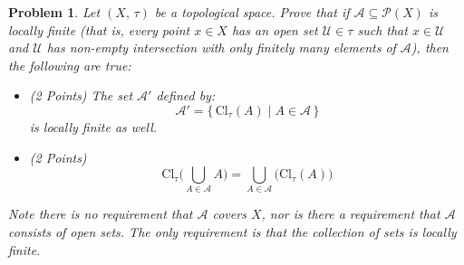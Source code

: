 \documentclass{article}
\theoremstyle{normal}
\newtheorem{problem}{Problem}
\begin{document}
    \begin{problem}
        Let $(X,\,\tau)$ be a topological space. Prove that if
        $\mathcal{A}\subseteq\mathcal{P}(X)$ is locally finite (that is,
        every point $x\in{X}$ has an open set $\mathcal{U}\in\tau$ such that
        $x\in\mathcal{U}$ and $\mathcal{U}$ has non-empty intersection with
        only finitely many elements of $\mathcal{A}$), then the following are
        true:
        \begin{itemize}
            \item (2 Points) The set $\mathcal{A}'$ defined by:
                \begin{equation}
                    \mathcal{A}'=
                    \{\,\textrm{Cl}_{\tau}(A)\;|\;A\in\mathcal{A}\,\}
                \end{equation}
                is locally finite as well.
            \item (2 Points)
                \begin{equation}
                    \textrm{Cl}_{\tau}\Big(\bigcup_{A\in\mathcal{A}}A\Big)
                    =\bigcup_{A\in\mathcal{A}}\big(\textrm{Cl}_{\tau}(A)\big)
                \end{equation}
        \end{itemize}
        Note there is no requirement that $\mathcal{A}$ covers $X$, nor is there
        a requirement that $\mathcal{A}$ consists of open sets. The only
        requirement is that the collection of sets is locally finite.
    \end{problem}
\end{document}
